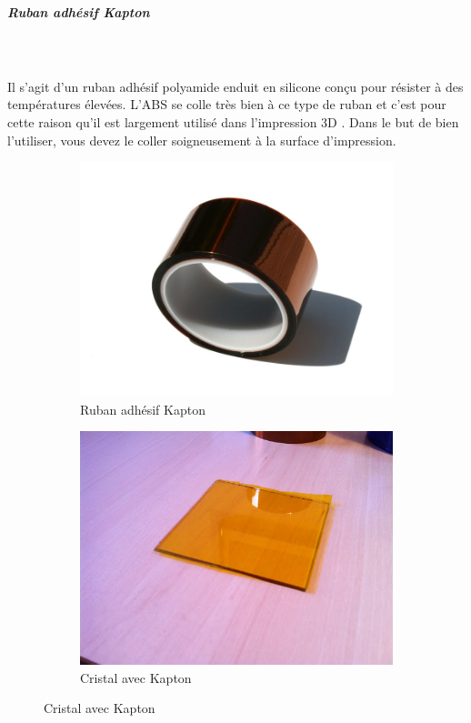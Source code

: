 \documentclass[11pt,a4paper]{article}
\begin{document}
				\subparagraph{Ruban adhésif Kapton}\mbox{}\\\\
Il s'agit d'un ruban adhésif polyamide enduit en silicone conçu pour résister à des températures élevées. L’ABS se colle très bien à ce type de ruban et c’est pour cette raison qu’il est largement utilisé dans l’impression 3D . Dans le but de bien l’utiliser, vous devez le coller soigneusement à la surface d'impression.
\begin{figure}[H]
    \centering
    \begin{subfigure}[b]{0.4\textwidth}
        \includegraphics[width=\textwidth,cfbox=azul_marcos 4pt 0pt]{FOTOS/KAPTON1}
	\caption*{Ruban adhésif Kapton}
    \end{subfigure}
    \qquad %
    \begin{subfigure}[b]{0.4\textwidth}
        \includegraphics[width=\textwidth,cfbox=azul_marcos 4pt 0pt]{FOTOS/KAPTON2}
	\caption*{Cristal avec Kapton}
    \end{subfigure}   
\end{figure}
\end{document}
